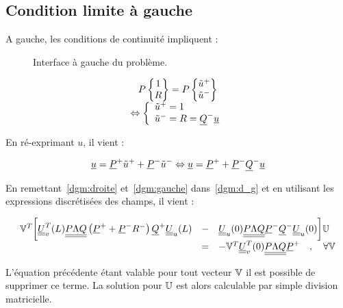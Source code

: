 \subsection{Condition limite à gauche}

A gauche, les conditions de continuité impliquent :

\begin{figure}[!ht]
	\centering
	
    \caption{\label{fig:interface}Interface à gauche du problème.}
\end{figure}

\begin{equation*}
    \begin{array}{c}
        P\begin{Bmatrix}1\\R\end{Bmatrix} = P\begin{Bmatrix}\tilde{u}^+\\\tilde{u}^-\end{Bmatrix}\\
            \Leftrightarrow \left\{\begin{array}{l}
                    \tilde{u}^+ = 1\\
                    \tilde{u}^- = R = \underline{Q}^-\underline{u}
            \end{array}\right.
    \end{array}
\end{equation*}

En ré-exprimant $u$, il vient :

\begin{equation}
    \underline{u} = \underline{P}^+\tilde{u}^+ + \underline{P}^-\tilde{u}^- \Leftrightarrow \underline{u} = \underline{P}^+ + \underline{P}^-\underline{Q}^-\underline{u}\label{dgm:gauche}
\end{equation}

En remettant~\eqref{dgm:droite} et~\eqref{dgm:gauche} dans~\eqref{dgm:d_g} et en utilisant les expressions discrétisées
des champs, il vient :

\begin{equation}
    \begin{array}{rcl}
        \mathbb{V}^T\bigg[\underline{\underline{U}}_v^T(L)\underline{\underline{P\Lambda Q}}\left(\underline{P}^+ + \underline{P}^-R^-\right)\underline{Q}^+\underline{\underline{U}}_u(L) & - &
    \underline{\underline{U}}_u(0)\underline{\underline{P\Lambda Q}}\underline{P}^-\underline{Q}^-\underline{\underline{U}}_u(0)\bigg] \mathbb{U}\\
    & = & - \mathbb{V}^T\underline{\underline{U}}_v^T(0)\underline{\underline{P\Lambda Q}}\underline{P}^+ \quad,\quad \forall\mathbb{V}
    \end{array}
\end{equation}

L'équation précédente étant valable pour tout vecteur $\mathbb{V}$ il est possible de supprimer ce terme.
La solution pour $\mathbb{U}$ est alors calculable par simple division matricielle.


